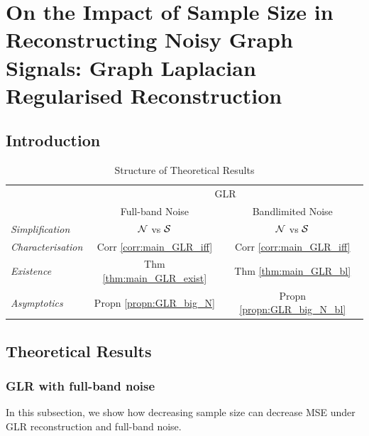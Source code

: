 \chapter{\label{ch:proj1_GLR}On the Impact of Sample Size in Reconstructing Noisy Graph Signals: Graph Laplacian Regularised Reconstruction}

\section{Introduction}




\begin{table}[h]
\caption{Structure of Theoretical Results}
\centering
\begin{tabular}{@{} l   c c @{}}
\toprule
 & \multicolumn{2}{c}{GLR} \\
\cmidrule(lr){2-3}
{} & Full-band Noise & Bandlimited Noise \\
\midrule
\emph{Simplification}  & {$\mathcal{N}$ vs $\mathcal{S}$}   & {$\mathcal{N}$ vs $\mathcal{S}$}  \\
\midrule
\emph{Characterisation} & {Corr \ref{corr:main_GLR_iff}} & {Corr \ref{corr:main_GLR_iff}} \\
\midrule
\emph{Existence} & Thm \ref{thm:main_GLR_exist} & Thm \ref{thm:main_GLR_bl}  \\
\midrule
\emph{Asymptotics} &  Propn \ref{propn:GLR_big_N} & Propn \ref{propn:GLR_big_N_bl}\\
\bottomrule
\end{tabular}
\label{tbl:general_theory}
\end{table}

\section{Theoretical Results}
\subsection{GLR with full-band noise}
\label{sec:GLR_full_band}
In this subsection, we show how decreasing sample size can decrease MSE under GLR reconstruction and full-band noise. 


